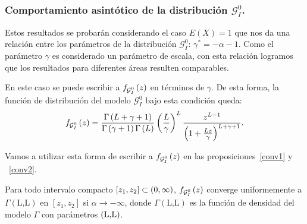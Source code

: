 \subsubsection{Comportamiento asintótico de la distribución $\mathcal{G}_I^0$.}
Estos resultados se probarán considerando el caso $E(X)=1$ que nos da una relación entre los parámetros de la distribución $\mathcal{G}_I^0$: $\gamma^*=-\alpha-1$. Como el parámetro $\gamma$ es considerado un parámetro de escala, con esta relación logramos que los resultados para diferentes áreas resulten comparables.
 
En este caso se puede escribir a $f_{\mathcal{G}_I^0}\left( z \right)$ en términos de $\gamma$. De esta forma, la función de distribución del modelo $\mathcal{G}_I^0$ bajo esta condición queda:
\begin{align}
\label{fenfunciondegamma}
f_{\mathcal{G}_I^0}\left( z \right)=\frac{\Gamma\left( L+\gamma+1 \right)}{\Gamma\left( \gamma+1 \right)\Gamma\left( L \right)}
\left( \frac{L}{\gamma} \right)^L \frac{z^{L-1}}{\left( 1+\frac{Lz}{\gamma} \right)^{L+\gamma+1}}.
\end{align}

Vamos a utilizar esta forma de escribir a $f_{\mathcal{G}_I^0}\left( z \right)$ en las proposiciones~\ref{conv1} y ~\ref{conv2}.

\begin{proposition}
	\label{conv1}
	Para todo intervalo compacto $[z_{1},z_{2}]\subset\left( 0,\infty \right)$, $f_{\mathcal{G}_I^0}\left( z \right)$ converge
	uniformemente a $\Gamma(\text{L,L})$ en $[z_{1},z_{2}]$ si $\alpha\to -\infty$,
	donde $\Gamma(\text{L,L})$ es la función de densidad del modelo $\Gamma$ con parámetros $\left( \text{L,L} \right)$.
\end{proposition}

